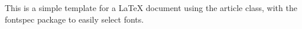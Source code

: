 \documentclass{article}
\begin{document}
This is a simple template for a \LaTeX{} document using the article class, with the fontspec package to easily select fonts.
\end{document}
